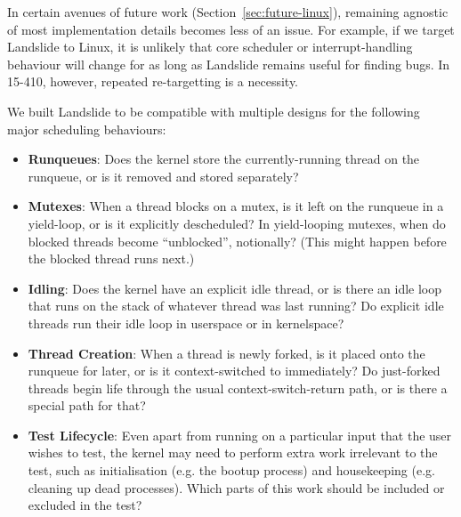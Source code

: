 In certain avenues of future work (Section~\ref{sec:future-linux}), remaining agnostic of most implementation details becomes less of an issue. For example, if we target Landslide to Linux, it is unlikely that core scheduler or interrupt-handling behaviour will change for as long as Landslide remains useful for finding bugs. In 15-410, however, repeated re-targetting is a necessity.

We built Landslide to be compatible with multiple designs for the following major scheduling behaviours:

\begin{itemize}
	\item {\bf Runqueues}: Does the kernel store the currently-running thread on the runqueue, or is it removed and stored separately?
	\item {\bf Mutexes}: When a thread blocks on a mutex, is it left on the runqueue in a yield-loop, or is it explicitly descheduled? In yield-looping mutexes, when do blocked threads become ``unblocked'', notionally? (This might happen before the blocked thread runs next.)
	\item {\bf Idling}: Does the kernel have an explicit idle thread, or is there an idle loop that runs on the stack of whatever thread was last running? Do explicit idle threads run their idle loop in userspace or in kernelspace?
	\item {\bf Thread Creation}: When a thread is newly forked, is it placed onto the runqueue for later, or is it context-switched to immediately? Do just-forked threads begin life through the usual context-switch-return path, or is there a special path for that?
	\item {\bf Test Lifecycle}: Even apart from running on a particular input that the user wishes to test, the kernel may need to perform extra work irrelevant to the test, such as initialisation (e.g. the bootup process) and housekeeping (e.g. cleaning up dead processes). Which parts of this work should be included or excluded in the test?
\end{itemize}
